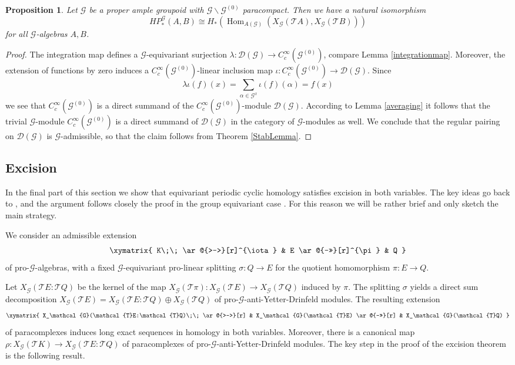 \documentclass{amsart}
\newtheorem{prop}[thm]{Proposition}
\newcommand{\G}{\mathcal{G}}
\newcommand{\T}{\mathcal{T}}
\newcommand{\DG}{\mathcal{D}(\mathcal{G})}
\newcommand{\ccinfty}{C_c^\infty}
\DeclareMathOperator{\Hom}{Hom}
\begin{document}
\begin{prop}
Let $ \G $ be a proper ample groupoid with $ \G \backslash \G^{(0)} $ paracompact. Then we have a natural isomorphism 
$$
HP_*^\G(A,B) \cong H_*(\Hom_{A(\G)}(X_\G(\T A), X_\G(\T B)))
$$
for all $ \G $-algebras $ A, B $. 
\end{prop}

\begin{proof} 
The integration map defines a $ \G $-equivariant surjection $ \lambda: \DG \rightarrow \ccinfty(\G^{(0)}) $, compare Lemma \ref{integrationmap}. 
Moreover, the extension of functions by zero induces a $ \ccinfty(\G^{(0)}) $-linear inclusion map $ \iota: \ccinfty(\G^{(0)}) \rightarrow \DG $. Since 
$$
\lambda \iota(f)(x) = \sum_{\alpha \in \G^x} \iota(f)(\alpha) = f(x) 
$$
we see that $ \ccinfty(\G^{(0)}) $ is a direct summand of the $ \ccinfty(\G^{(0)}) $-module $ \DG $. According to Lemma \ref{averaging} it follows that the 
trivial $ \G $-module $ \ccinfty(\G^{(0)}) $ is a direct summand of $ \DG $ in the category of $ \G $-modules as well. We conclude that the regular pairing on $ \DG $ 
is $ \G $-admissible, so that the claim follows from Theorem \ref{StabLemma}. 
\end{proof}


\subsection{Excision} \label{section:excision}

In the final part of this section we show that equivariant periodic cyclic homology satisfies excision in both variables. The key ideas go back to \cite{MEYER_thesis}, and the argument follows closely the proof in the group equivariant case \cite{VOIGT_equivariantperiodiccyclichomology}. For this reason we will be rather brief and only sketch the main strategy. 

We consider an admissible extension 
\begin{equation*} \label{eqext}
   \xymatrix{
     K\;\; \ar@{>->}[r]^{\iota} & E \ar@{->>}[r]^{\pi} & Q 
     }
\end{equation*}
of pro-$ \G $-algebras, with a fixed $ \G $-equivariant pro-linear splitting $ \sigma: Q \rightarrow E $ for the quotient homomorphism $ \pi: E \rightarrow Q $. 

Let $ X_\G(\T E:\T Q) $ be the kernel of the map $ X_\G(\T\pi): X_\G(\T E) \rightarrow X_\G(\T Q) $ induced by $ \pi $. The splitting $ \sigma $ yields a direct sum decomposition $ X_\G(\T E) = X_\G(\T E:\T Q) \oplus X_\G(\T Q) $ of pro-$ \G $-anti-Yetter-Drinfeld modules. The resulting extension 
$$ 
   \xymatrix{
      X_\G(\T E:\T Q)\;\; \ar@{>->}[r] & X_\G(\T E) \ar@{->>}[r] & X_\G(\T Q) 
     }
$$ 
of paracomplexes induces long exact sequences in homology in both variables. Moreover, there is a canonical map $ \rho: X_\G(\T K) \rightarrow X_\G(\T E:\T Q) $ of paracomplexes of pro-$ \G $-anti-Yetter-Drinfeld modules. The key step in the proof of the excision theorem is the following result. 
\end{document}
